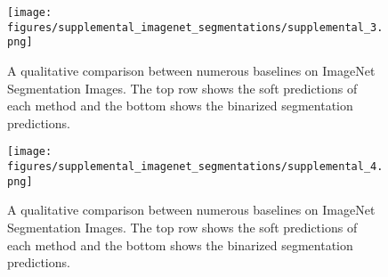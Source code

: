 \begin{figure*}
    \centering
    \texttt{[image: figures/supplemental\_imagenet\_segmentations/supplemental\_3.png]}
    \caption{A qualitative comparison between numerous baselines on ImageNet Segmentation Images. The top row shows the soft predictions of each method and the bottom shows the binarized segmentation predictions. }
    \label{fig:enter-label}
\end{figure*}


\begin{figure*}
    \centering
    \texttt{[image: figures/supplemental\_imagenet\_segmentations/supplemental\_4.png]}
    \caption{A qualitative comparison between numerous baselines on ImageNet Segmentation Images. The top row shows the soft predictions of each method and the bottom shows the binarized segmentation predictions. }
    \label{fig:enter-label}
\end{figure*}



